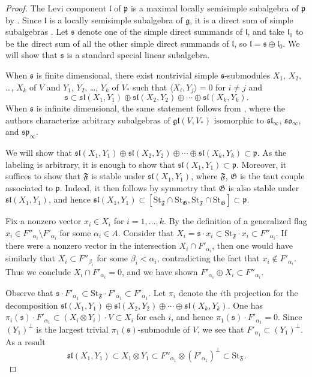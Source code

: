 \documentclass{amsart}
\theoremstyle{definition}
\theoremstyle{remark}
\numberwithin{equation}{section}
\newcommand {\St} {\mathrm{St}}
\def\gl{\mathfrak {gl}}
\def\g{\mathfrak {g}}
\def\l{\mathfrak {l}}
\def\p{\mathfrak {p}}
\def\sl{\mathfrak{sl}}
\def\so{\mathfrak{so}}
\def\sp{\mathfrak{sp}}
\def\s{\mathfrak{s}}
\def\F{\mathfrak{F}}
\def\G{\mathfrak{G}}
\begin{document}
\begin{proof}
 The Levi component $\l$ of $\p$ is a maximal locally semisimple subalgebra of $\p$ by \cite[Theorem 4.3]{DP}.
Since $\l$ is a locally semisimple subalgebra of $\g$, it is a direct sum of simple subalgebras \cite{DimitrovP2}.  Let $\s$ denote one of the simple direct summands of $\l$, and take $\l_0$ to be the direct sum of all the other simple direct summands of $\l$, so $\l = \s \oplus \l_0$.
We will show that $\s$ is a standard special linear subalgebra.

When $\s$ is finite dimensional, there exist nontrivial simple $\s$-submodules $X_1$, $X_2$, \ldots, $X_k$ of $V$ and $Y_1$, $Y_2$, \ldots, $Y_k$ of $V_*$ such that $\langle X_i , Y_j \rangle = 0$ for $i \neq j$ and $$\s \subset \sl(X_1 , Y_1) \oplus \sl(X_2, Y_2) \oplus \cdots \oplus \sl(X_k, Y_k).$$  When $\s$ is infinite dimensional, the same statement follows from \cite{DimitrovP2}, where the authors characterize arbitrary subalgebras of $\gl(V,V_*)$ isomorphic to $\sl_\infty$, $\so_\infty$, and $\sp_\infty$.

We will show that $\sl(X_1 , Y_1) \oplus \sl(X_2, Y_2) \oplus \cdots \oplus \sl(X_k, Y_k) \subset \p$.  As the labeling is arbitrary, it is enough to show that $\sl(X_1, Y_1) \subset \p$.  Moreover, it suffices to show that $\F$ is stable under $\sl(X_1, Y_1)$, where $\F$, $\G$ is the taut couple associated to $\p$.  Indeed, it then follows by symmetry that $\G$ is also stable under $\sl(X_1, Y_1)$, and hence $\sl(X_1, Y_1) \subset [ \St_\F \cap \St_\G , \St_\F \cap \St_\G ] \subset \p$.

Fix a nonzero vector $x_i \in X_i$ for $i = 1, \ldots, k$.  By the definition of a generalized flag $x_i \in F''_{\alpha_i} \setminus F'_{\alpha_i}$ for some $\alpha_i \in A$.  Consider that $X_i =\s \cdot x_i \subset \St_\F \cdot x_i \subset F''_{\alpha_i}$.
If there were a nonzero vector in the intersection $X_i \cap F'_{\alpha_i}$, then one would have similarly that $X_i \subset F''_{\beta_i}$ for some $\beta_i < \alpha_i$, contradicting the fact that $x_i \notin F'_{\alpha_i}$.  Thus we conclude $X_i \cap F'_{\alpha_i} = 0$, and we have shown $F'_{\alpha_i} \oplus X_i \subset F''_{\alpha_i}$.  

Observe that $\s \cdot F'_{\alpha_1} \subset \St_\F \cdot F'_{\alpha_1} \subset F'_{\alpha_1}$.
Let $\pi_i$ denote the $i$th projection for the decomposition $\sl(X_1 , Y_1) \oplus \sl(X_2, Y_2) \oplus \cdots \oplus \sl(X_k, Y_k)$.  One has $\pi_i(\s) \cdot F'_{\alpha_1} \subset ( X_i \otimes Y_i ) \cdot V \subset X_i$ for each $i$, and hence $\pi_1 (\s) \cdot F'_{\alpha_1} = 0$.  Since $(Y_1)^\perp$ is the largest trivial $\pi_1(\s)$-submodule of $V$, we see that $F'_{\alpha_1} \subset (Y_1)^\perp$.  As a result
\begin{equation*}\sl(X_1 , Y_1) \subset X_1 \otimes Y_1 \subset F''_{\alpha_1} \otimes (F'_{\alpha_1})^\perp \subset \St_\F. 
\end{equation*}


\end{proof}
\end{document}
